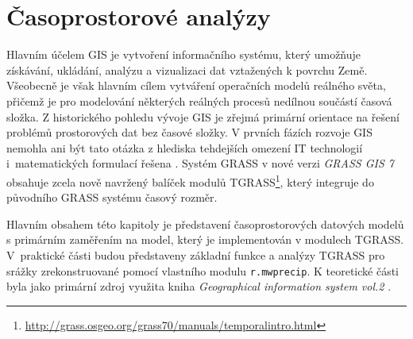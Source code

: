 \documentclass[a4paper,12pt,oneside]{report}
\begin{document}
\newpage
\setcounter{footnote}{1}
\section{Časoprostorové analýzy}

Hlavním účelem GIS je vytvoření informačního systému, který umožňuje
získá\-vání, ukládání, analýzu a vizualizaci dat vztažených k povrchu
Země.  Všeobecně je však hlavním cílem vytváření operačních modelů
reálného světa, přičemž je pro modelo\-vání některých reálných procesů
nedílnou součástí časová složka.  Z histo\-rického pohledu vývoje GIS
je zřejmá primární orientace na řešení problémů
prostorových dat bez časové  složky. V prvních fázích rozvoje GIS
nemohla ani být tato otázka z hlediska tehdejších omezení IT
technologií i~matematických formulací řešena
\cite{geospatialanal}. Systém GRASS v nové verzi \textit{GRASS
  GIS 7} obsahuje zcela nově navržený balíček modulů
TGRASS\footnote{\url{http://grass.osgeo.org/grass70/manuals/temporalintro.html}},
který integruje do původního GRASS systému časový rozměr.

Hlavním obsahem této kapitoly je představení časoprostorových
datových modelů s primárním zaměřením na model, který je implementován
v modulech TGRASS. V~praktické části budou představeny základní funkce
a analýzy TGRASS pro  srážky zrekonstruované pomocí vlastního modulu
\texttt{r.mwprecip}. K teoretické části byla jako primární zdroj
využita kniha \textit{Geographical information system vol.2} \cite{gistemporal}.
\end{document}

